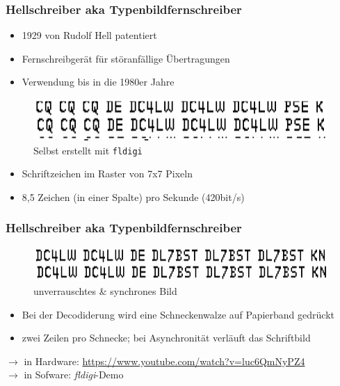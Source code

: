 \begin{frame}
  \frametitle{Hellschreiber aka Typenbildfernschreiber}

  \begin{itemize}
    \item 1929 von Rudolf Hell patentiert
    \item Fernschreibgerät für störanfällige Übertragungen
    \item Verwendung bis in die 1980er Jahre
  \end{itemize}

  \begin{center}
    \begin{figure}
      \includegraphics[width=.6\textwidth,height=.4\textheight,keepaspectratio]{e16/Hell_cq.png}
      \caption{Selbst erstellt mit \texttt{fldigi}}
    \end{figure}
  \end{center}

  \begin{itemize}
    \item Schriftzeichen im Raster von 7x7 Pixeln
    \item 8,5 Zeichen (in einer Spalte) pro Sekunde (420bit/s)
  \end{itemize}

\end{frame}

\begin{frame}
  \frametitle{Hellschreiber aka Typenbildfernschreiber}

  \begin{center}
    \begin{figure}
      \includegraphics[width=.6\textwidth,height=.4\textheight,keepaspectratio]{e16/Hell_ans.png}
      \caption{unverrauschtes \& synchrones Bild}
    \end{figure}
  \end{center}

  \begin{itemize}
    \item Bei der Decodiderung wird eine Schneckenwalze auf Papierband gedrückt
    \item zwei Zeilen pro Schnecke; bei Asynchronität verläuft das Schriftbild
  \end{itemize}

  \bigskip

  $\rightarrow$ in Hardware: \url{https://www.youtube.com/watch?v=luc6QmNyPZ4} \\
  $\rightarrow$ in Sofware: \emph{fldigi}-Demo

\end{frame}

